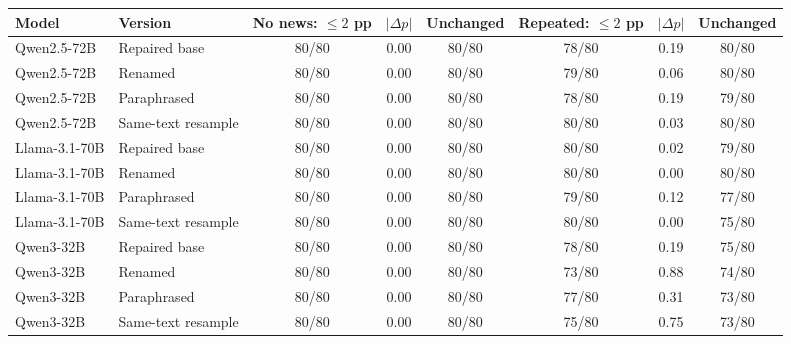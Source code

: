 \begin{tabular}{@{}llcccccc@{}}
\toprule
Model & Version & No news: $\leq2$ pp & $|\Delta p|$ & Unchanged & Repeated: $\leq2$ pp & $|\Delta p|$ & Unchanged \\
\midrule
Qwen2.5-72B & Repaired base & 80/80 & 0.00 & 80/80 & 78/80 & 0.19 & 80/80 \\
Qwen2.5-72B & Renamed & 80/80 & 0.00 & 80/80 & 79/80 & 0.06 & 80/80 \\
Qwen2.5-72B & Paraphrased & 80/80 & 0.00 & 80/80 & 78/80 & 0.19 & 79/80 \\
Qwen2.5-72B & Same-text resample & 80/80 & 0.00 & 80/80 & 80/80 & 0.03 & 80/80 \\
Llama-3.1-70B & Repaired base & 80/80 & 0.00 & 80/80 & 80/80 & 0.02 & 79/80 \\
Llama-3.1-70B & Renamed & 80/80 & 0.00 & 80/80 & 80/80 & 0.00 & 80/80 \\
Llama-3.1-70B & Paraphrased & 80/80 & 0.00 & 80/80 & 79/80 & 0.12 & 77/80 \\
Llama-3.1-70B & Same-text resample & 80/80 & 0.00 & 80/80 & 80/80 & 0.00 & 75/80 \\
Qwen3-32B & Repaired base & 80/80 & 0.00 & 80/80 & 78/80 & 0.19 & 75/80 \\
Qwen3-32B & Renamed & 80/80 & 0.00 & 80/80 & 73/80 & 0.88 & 74/80 \\
Qwen3-32B & Paraphrased & 80/80 & 0.00 & 80/80 & 77/80 & 0.31 & 73/80 \\
Qwen3-32B & Same-text resample & 80/80 & 0.00 & 80/80 & 75/80 & 0.75 & 73/80 \\
\bottomrule
\end{tabular}
